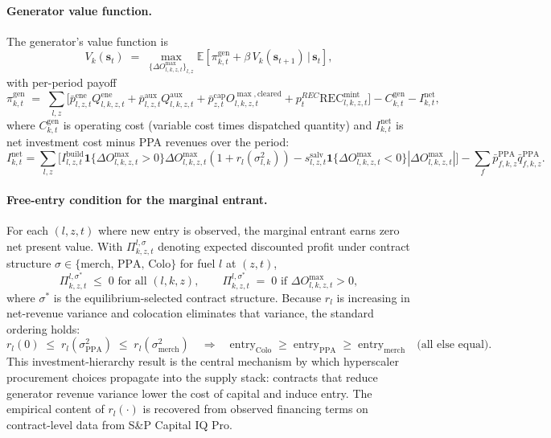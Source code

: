 \documentclass[12pt,letterpaper]{article}
\begin{document}
\paragraph{Generator value function.} The generator's value function is
\begin{equation}
\label{eq:gen_bellman}
V_{k}(\mathbf{s}_t) \;=\; \max_{\{\Delta O^{\max}_{l,k,z,t}\}_{l,z}}
\mathbb{E}\left[ \pi^{\text{gen}}_{k,t} + \beta\, V_k(\mathbf{s}_{t+1})
\,\big|\, \mathbf{s}_t \right],
\end{equation}
with per-period payoff
\begin{equation}
\label{eq:gen_flow}
\pi^{\text{gen}}_{k,t} \;=\; \sum_{l,z}\Big[
\bar p^{\text{ene}}_{l,z,t} Q^{\text{ene}}_{l,k,z,t}
+ \bar p^{\text{aux}}_{l,z,t} Q^{\text{aux}}_{l,k,z,t}
+ \bar p^{\text{cap}}_{z,t} O^{\max,\text{cleared}}_{l,k,z,t}
+ p^{REC}_t \text{REC}^{\text{mint}}_{l,k,z,t}
\Big]
- C^{\text{gen}}_{k,t} - I^{\text{net}}_{k,t},
\end{equation}
where $C^{\text{gen}}_{k,t}$ is operating cost (variable cost times dispatched
quantity) and $I^{\text{net}}_{k,t}$ is net investment cost minus PPA
revenues over the period:
\begin{equation}
I^{\text{net}}_{k,t} = \sum_{l,z}\big[ I^{\text{build}}_{l,z,t} \mathbf{1}\{\Delta O^{\max}_{l,k,z,t} > 0\} \Delta O^{\max}_{l,k,z,t} (1 + r_l(\sigma^2_{l,k}))
- s^{\text{salv}}_{l,z,t} \mathbf{1}\{\Delta O^{\max}_{l,k,z,t} < 0\} |\Delta O^{\max}_{l,k,z,t}|\big]
- \sum_f \bar p^{\text{PPA}}_{f,k,z} \bar q^{\text{PPA}}_{f,k,z}.
\end{equation}

\paragraph{Free-entry condition for the marginal entrant.} For each
$(l, z, t)$ where new entry is observed, the marginal entrant earns
zero net present value. With $\Pi^{l,\sigma}_{k,z,t}$ denoting expected
discounted profit under contract structure $\sigma \in \{\text{merch, PPA,
Colo}\}$ for fuel $l$ at $(z,t)$,
\begin{equation}
\label{eq:gen_free_entry}
\Pi^{l, \sigma^*}_{k,z,t} \;\leq\; 0 \text{ for all } (l,k,z),\qquad
\Pi^{l, \sigma^*}_{k,z,t} \;=\; 0 \text{ if } \Delta O^{\max}_{l,k,z,t} > 0,
\end{equation}
where $\sigma^*$ is the equilibrium-selected contract structure. Because
$r_l$ is increasing in net-revenue variance and colocation eliminates that
variance, the standard ordering holds:
\begin{equation}
\label{eq:entry_ordering}
r_l(0) \;\leq\; r_l(\sigma^2_{\text{PPA}}) \;\leq\; r_l(\sigma^2_{\text{merch}})
\quad\Rightarrow\quad
\text{entry}_{\text{Colo}} \;\geq\; \text{entry}_{\text{PPA}} \;\geq\; \text{entry}_{\text{merch}}
\quad \text{(all else equal)}.
\end{equation}
This investment-hierarchy result is the central mechanism by which
hyperscaler procurement choices propagate into the supply stack: contracts
that reduce generator revenue variance lower the cost of capital and induce
entry. The empirical content of $r_l(\cdot)$ is recovered from observed
financing terms on contract-level data from S\&P Capital IQ Pro.
\end{document}

